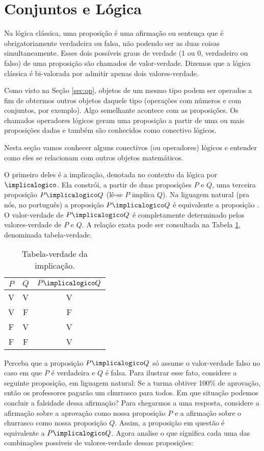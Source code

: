 \section{Conjuntos e Lógica}

Na lógica clássica, uma proposição é uma afirmação ou sentença que é obrigatoriamente verdadeira ou falsa, não podendo ser as duas coisas simultaneamente. Esses dois possíveis graus de verdade (1 ou 0, verdadeiro ou falso) de uma proposição são chamados de valor-verdade. Dizemos que a lógica clássica é bi-valorada por admitir apenas dois valores-verdade. 

Como visto na Seção \ref{sec:op}, objetos de um mesmo tipo podem ser operados a  fim de obtermos outros objetos daquele tipo (operações com números e com conjuntos, por exemplo). Algo semelhante acontece com as proposições. Os chamados operadores lógicos geram uma proposição a partir de uma ou mais proposições dadas e também são conhecidos como conectivo lógicos.
 
Nesta seção vamos conhecer alguns conectivos (ou operadores) lógicos e entender como eles se relacionam com outros objetos matemáticos.

O primeiro deles é a implicação, denotada no contexto da lógica por $\implicalogico$.  Ela constrói, a partir de duas proposições $P$ e $Q$, uma terceira proposição $P \implicalogico Q$ (lê-se $P$ implica $Q$). Na liguagem natural (pra nós, no português) a proposição $P\implicalogico Q$ é equivalente a proposição . O valor-verdade de $P \implicalogico Q$ é completamente determinado pelos valores-verdade de $P$ e $Q$. A relação exata pode ser consultada na Tabela \ref{tbl:implicacao}, denominada tabela-verdade.

\begin{table}[h]
	\centering
	\begin{tabular}{cc|c}
		$P$		& $Q$		& $P \implicalogico Q$ \\ \hline
		V		& V			& V			           \\
		V		& F			& F			           \\
		F		& V			& V			           \\
		F		& F			& V			           \\	
	\end{tabular}
	\caption{Tabela-verdade da implicação.}
	\label{tbl:implicacao}
\end{table}

Perceba que a proposição $P\implicalogico Q$ só assume o valor-verdade falso no caso em que $P$ é verdadeira e $Q$ é falsa. Para ilustrar esse fato, considere a seguinte proposição, em liguagem natural: Se a turma obtiver 100\% de aprovação, então os professores pagarão um churrasco para todos. Em que situação podemos concluir a falsidade dessa afirmação? 
Para chegarmos a uma resposta, considere a afirmação sobre a aprovação como nossa proposição $P$ e a afirmação sobre o churrasco como nossa proposição $Q$. Assim, a proposição em questão é equivalente a $P\implicalogico Q$. 
Agora analise o que significa cada uma das combinações possiveis de valores-verdade dessas proposições:

